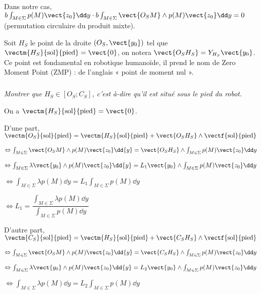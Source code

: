 \begin{multicols}{2}
\begin{corrige}
Dans notre cas, $b\int_{M\in\Sigma} p(M)\vect{z_0} \dd y \cdot b\int_{M\in\Sigma} \vect{O_S M} \wedge p(M)\vect{z_0} \dd y = 0$ (permutation circulaire du produit mixte). 


 
\end{corrige}
\else
\fi

\ifprof
\else

Soit $H_S$ le point de la droite $\left(O_S,\vect{y_0}\right)$ tel que  
$\vectm{H_S}{\text{sol}}{\text{pied}}=\vect{0}$, on notera $\vect{O_SH_S} = Y_{H_S}\vect{y_0}$. Ce point est
fondamental en robotique humanoïde, il prend le nom de Zero Moment Point (ZMP) : de l'anglais « point de
moment nul ».

\fi


\subparagraph{} \textit{Montrer que $H_S\in [O_S;C_S]$, c'est à-dire qu'il est situé sous le pied du robot.}
\ifprof
\begin{corrige}
On a $   \vectm{H_S}{\text{sol}}{\text{pied}} =\vect{0}$.

D'une part,  $\vectm{O_S}{\text{sol}}{\text{pied}} =  \vectm{H_S}{\text{sol}}{\text{pied}} + \vect{ O_SH_S} \wedge \vectf{\text{sol}}{\text{pied}}$

$\Leftrightarrow  \int_{M\in\Sigma} \vect{O_S M} \wedge p(M)\vect{z_0} \dd {y}=   \vect{ O_SH_S} \wedge \int_{M\in\Sigma} p(M)\vect{z_0} \dd y$

$\Leftrightarrow \int_{M\in\Sigma} \lambda \vect{y_0} \wedge p(M)\vect{z_0} \dd {y}=   L_1 \vect{y_0} \wedge \int_{M\in\Sigma} p(M)\vect{z_0} \dd y$

$\Leftrightarrow  \int_{M\in\Sigma}\lambda  p(M) \dd {y}=   L_1  \int_{M\in\Sigma} p(M) \dd y$

$\Leftrightarrow L_1 = \dfrac{\int_{M\in\Sigma}\lambda  p(M) \dd {y}}{  \int_{M\in\Sigma} p(M) \dd y}$

D'autre part,  $\vectm{C_S}{\text{sol}}{\text{pied}} =  \vectm{H_S}{\text{sol}}{\text{pied}} + \vect{ C_SH_S} \wedge \vectf{\text{sol}}{\text{pied}}$

$\Leftrightarrow  \int_{M\in\Sigma} \vect{O_S M} \wedge p(M)\vect{z_0} \dd {y}=  \vect{ C_SH_S}  \wedge \int_{M\in\Sigma} p(M)\vect{z_0} \dd y$

$\Leftrightarrow  \int_{M\in\Sigma} \lambda \vect{y_0} \wedge p(M)\vect{z_0} \dd {y}=  L_2 \vect{y_0}   \wedge \int_{M\in\Sigma} p(M)\vect{z_0} \dd y$


$\Leftrightarrow  \int_{M\in\Sigma} \lambda  p(M)\dd {y}=  L_2   \int_{M\in\Sigma} p(M) \dd y$


\end{corrige}
\end{multicols}
